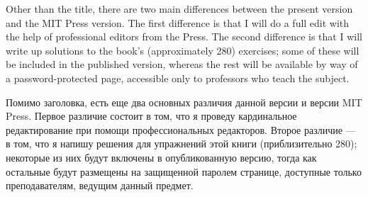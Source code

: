 \begin{blockENG}
Other than the title, there are two main differences between the present version and the MIT Press version. The first difference is that I will do a full edit with the help of professional editors from the Press. The second difference is that I will write up solutions to the book's (approximately 280) exercises; some of these will be included in the published version, whereas the rest will be available by way of a password-protected page, accessible only to professors who teach the subject.
\end{blockENG}

\begin{blockRUS}
Помимо заголовка, есть еще два основных различия данной версии и версии MIT Press. Первое различие состоит в том, что я проведу кардинальное редактирование при помощи профессиональных редакторов. Второе различие — в том, что я напишу решения для упражнений этой книги (приблизительно 280); некоторые из них будут включены в опубликованную версию, тогда как остальные будут размещены на защищенной паролем странице, доступные только преподавателям, ведущим данный предмет. 
\end{blockRUS}

